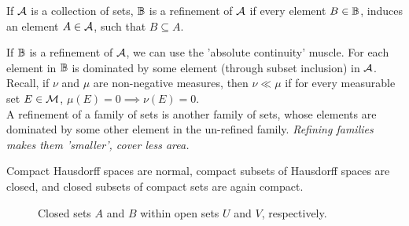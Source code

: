 \documentclass[../main-manifolds.tex]{subfiles}
\begin{document}
\begin{definition}[Refinement]\label{chp4:refinement-definition}
    If $\mathcal{A}$ is a collection of sets, ${\mathbb{B}}$ is a refinement of $\mathcal{A}$ if every element $B\in{\mathbb{B}}$, induces an element $A\in\mathcal{A}$, such that $B\subseteq A$.
\end{definition}
\begin{remark}
    If ${\mathbb{B}}$ is a refinement of $\mathcal{A}$, we can use the 'absolute continuity' muscle. For each element in ${\mathbb{B}}$ is dominated by some element (through subset inclusion) in $\mathcal{A}$. Recall, if $\nu$ and $\mu$ are non-negative measures, then $\nu\ll\mu$ if for every measurable set $E\in\mathcal{M}$, $\mu(E)=0\implies \nu(E)=0$.\\
    
    A refinement of a family of sets is another family of sets, whose elements are dominated by some other element in the un-refined family. \emph{Refining families makes them 'smaller', cover less area.}
\end{remark}

\begin{wts}
    Compact Hausdorff spaces are normal, compact subsets of Hausdorff spaces are closed, and closed subsets of compact sets are again compact. 
\end{wts}




\begin{figure}[htbp]
        \centering
        \caption{Closed sets $A$ and $B$ within open sets $U$ and $V$, respectively.}
        \label{lee-appendix-A.45-graphic}
\end{figure}
\end{document}
